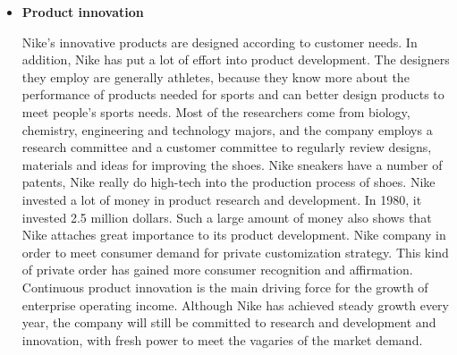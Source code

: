 \documentclass[a4paper, 12pt]{report}
\begin{document}
\begin{itemize}
    \item \textbf{Product innovation} \par Nike's innovative products are designed according to customer needs. In addition, Nike has put a lot of effort into product development. The designers they employ are generally athletes, because they know more about the performance of products needed for sports and can better design products to meet people's sports needs. Most of the researchers come from biology, chemistry, engineering and technology majors, and the company employs a research committee and a customer committee to regularly review designs, materials and ideas for improving the shoes. Nike sneakers have a number of patents, Nike really do high-tech into the production process of shoes. Nike invested a lot of money in product research and development. In 1980, it invested 2.5 million dollars. Such a large amount of money also shows that Nike attaches great importance to its product development. Nike company in order to meet consumer demand for private customization strategy. This kind of private order has gained more consumer recognition and affirmation. Continuous product innovation is the main driving force for the growth of enterprise operating income. Although Nike has achieved steady growth every year, the company will still be committed to research and development and innovation, with fresh power to meet the vagaries of the market demand.
\end{itemize}
\end{document}
